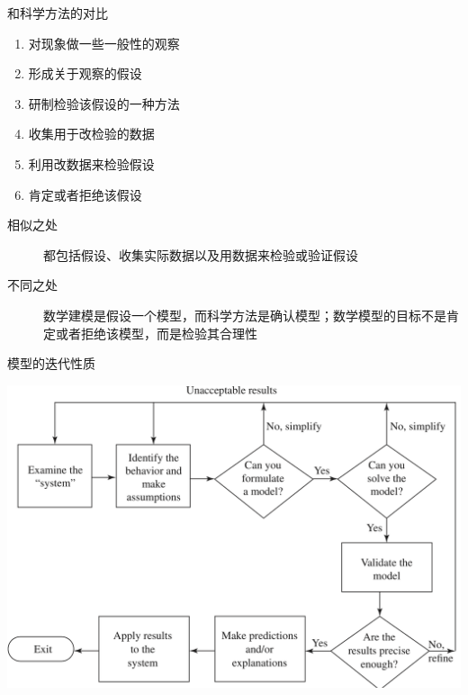 \documentclass[UTF8]{ctexbeamer}
\begin{document}
\begin{frame}{和科学方法的对比}

  \begin{enumerate}
  \item 对现象做一些一般性的观察
  \item 形成关于观察的假设
  \item 研制检验该假设的一种方法
  \item 收集用于改检验的数据
  \item 利用改数据来检验假设
  \item 肯定或者拒绝该假设
  \end{enumerate}

  \begin{description}
  \item[相似之处] 都包括假设、收集实际数据以及用数据来检验或验证假设
  \item[不同之处] 数学建模是假设一个模型，而科学方法是确认模型；数学模型的目标不是肯定或者拒绝该模型，而是检验其合理性
  \end{description}
  
\end{frame}

\begin{frame}{模型的迭代性质}

  \begin{center}
    \includegraphics[width=.8\textwidth{}]{modeliterate.png}
  \end{center}
  
\end{frame}
\end{document}
